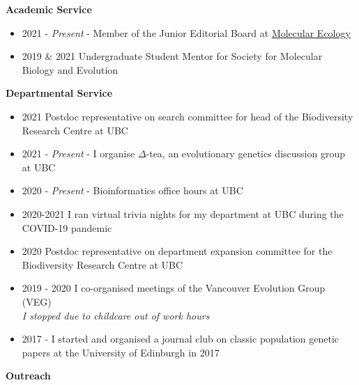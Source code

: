 \documentclass[11pt]{article}
\newenvironment{innerlist}[1][\enskip\textbullet]%
        {\begin{itemize}[#1,leftmargin=*,parsep=0pt,itemsep=0pt,topsep=0pt,partopsep=0pt]}
        {\end{itemize}}
\begin{document}
	\vspace{.1275in}

	{\bf Academic Service}
\begin{innerlist}

	\item[] 2021 - \textit{Present} - Member of the Junior Editorial Board at \href{https://onlinelibrary.wiley.com/page/journal/1365294x/homepage/editorialboard.html}{Molecular Ecology}
	
	\item[] 2019 \& 2021 Undergraduate Student Mentor for Society for Molecular Biology and Evolution
	
\end{innerlist}
\vspace{.1275in}


	{\bf Departmental Service}
\vspace{.1275in}

\begin{innerlist}
  \setlength\itemsep{0.3em}
	\item[] 2021  Postdoc representative on search committee for head of the Biodiversity Research Centre at UBC

	\item[] 2021 - \textit{Present} - I organise $\Delta$-tea, an evolutionary genetics discussion group at UBC
	
	\item[] 2020 - \textit{Present} - Bioinformatics office hours at UBC 
	
	\item[] 2020-2021  I ran virtual trivia nights for my department at UBC during the COVID-19 pandemic
	
	\item[] 2020  Postdoc representative on department expansion committee for the Biodiversity Research Centre at UBC


	\item[] 2019 - 2020 I co-organised meetings of the Vancouver Evolution Group (VEG)\\\emph{I stopped due to childcare out of work hours}

	\item[] 2017 - I started and organised a journal club on classic population genetic papers at the University of Edinburgh in 2017

\end{innerlist}
\vspace{.1275in}

	{\bf Outreach}
\vspace{.1275in}
\end{document}
